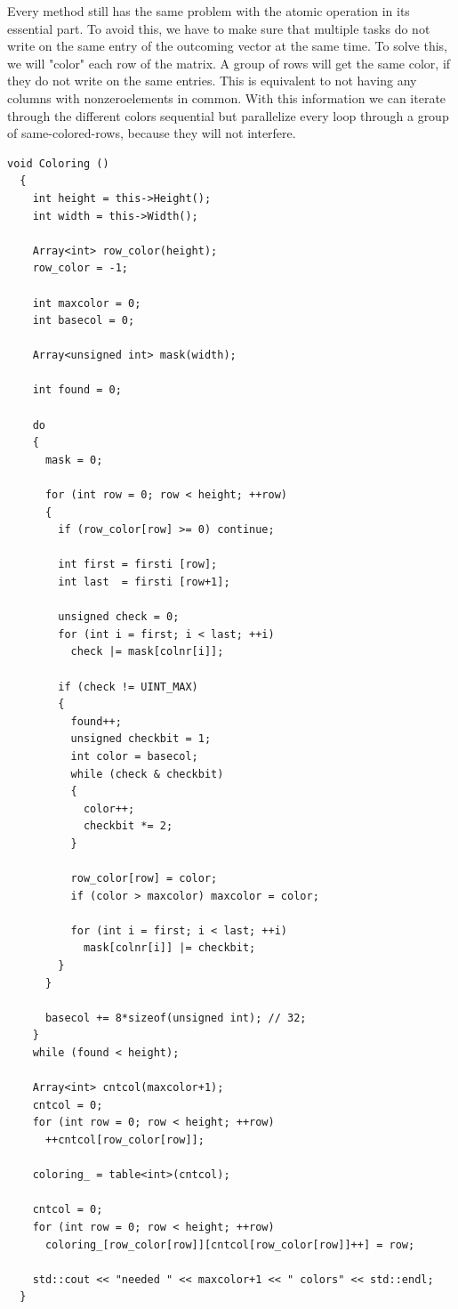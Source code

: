 \documentclass[a4paper,11pt]{scrartcl}
\begin{document}
Every method still has the same problem with the atomic operation in its
essential part. To avoid this, we have to make sure that multiple tasks do not
write on the same entry of the outcoming vector at the same time. To solve this,
 we will "color" each row of the matrix. A group of rows will get the same
color, if they do not write on the same entries. This is equivalent to not having
any columns with nonzeroelements in common. With this information we can iterate through the different colors sequential but parallelize every loop through
 a group of same-colored-rows, because they will not interfere.

\begin{lstlisting}
void Coloring ()
  {
    int height = this->Height();
    int width = this->Width();

    Array<int> row_color(height);
    row_color = -1;

    int maxcolor = 0;
    int basecol = 0;

    Array<unsigned int> mask(width);

    int found = 0;

    do
    {
      mask = 0;

      for (int row = 0; row < height; ++row)
      {
        if (row_color[row] >= 0) continue;

        int first = firsti [row];
        int last  = firsti [row+1];

        unsigned check = 0;
        for (int i = first; i < last; ++i)
          check |= mask[colnr[i]];

        if (check != UINT_MAX) 
        {
          found++;
          unsigned checkbit = 1;
          int color = basecol;
          while (check & checkbit)
          {
            color++;
            checkbit *= 2;
          }

          row_color[row] = color;
          if (color > maxcolor) maxcolor = color;

          for (int i = first; i < last; ++i)
            mask[colnr[i]] |= checkbit;
        }
      }

      basecol += 8*sizeof(unsigned int); // 32;
    }
    while (found < height);

    Array<int> cntcol(maxcolor+1);
    cntcol = 0;
    for (int row = 0; row < height; ++row)
      ++cntcol[row_color[row]];

    coloring_ = table<int>(cntcol);

    cntcol = 0;
    for (int row = 0; row < height; ++row)
      coloring_[row_color[row]][cntcol[row_color[row]]++] = row;

    std::cout << "needed " << maxcolor+1 << " colors" << std::endl;
  }

\end{lstlisting}
\end{document}
